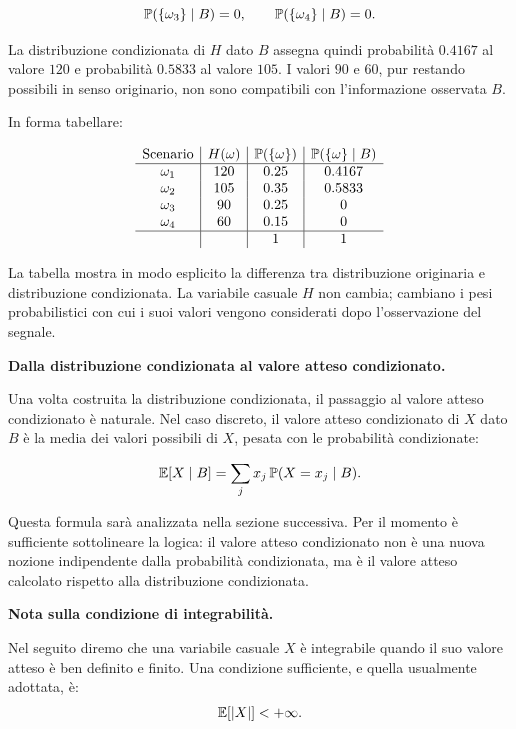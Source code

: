 \[
\mathbb{P}(\{\omega_3\}\mid B)=0,
\qquad
\mathbb{P}(\{\omega_4\}\mid B)=0.
\]

La distribuzione condizionata di $H$ dato $B$ assegna quindi probabilit\`{a} $0.4167$ al valore $120$ e probabilit\`{a} $0.5833$ al valore $105$. I valori $90$ e $60$, pur restando possibili in senso originario, non sono compatibili con l'informazione osservata $B$.

In forma tabellare:

\[
\begin{array}{c|c|c|c}
\text{Scenario} & H(\omega) & \mathbb{P}(\{\omega\}) & \mathbb{P}(\{\omega\}\mid B) \\
\hline
\omega_1 & 120 & 0.25 & 0.4167 \\
\omega_2 & 105 & 0.35 & 0.5833 \\
\omega_3 & 90  & 0.25 & 0 \\
\omega_4 & 60  & 0.15 & 0 \\
\hline
\ &   & 1 & 1 \\
\end{array}
\]

La tabella mostra in modo esplicito la differenza tra distribuzione originaria e distribuzione condizionata. La variabile casuale $H$ non cambia; cambiano i pesi probabilistici con cui i suoi valori vengono considerati dopo l'osservazione del segnale.

\medskip

\noindent
\textbf{Dalla distribuzione condizionata al valore atteso condizionato.}

Una volta costruita la distribuzione condizionata, il passaggio al valore atteso condizionato \`{e} naturale. Nel caso discreto, il valore atteso condizionato di $X$ dato $B$ \`{e} la media dei valori possibili di $X$, pesata con le probabilit\`{a} condizionate:

\[
\mathbb{E}[X\mid B]
=
\sum_j x_j\,\mathbb{P}(X=x_j\mid B).
\]

Questa formula sar\`{a} analizzata nella sezione successiva. Per il momento \`{e} sufficiente sottolineare la logica: il valore atteso condizionato non \`{e} una nuova nozione indipendente dalla probabilit\`{a} condizionata, ma \`{e} il valore atteso calcolato rispetto alla distribuzione condizionata.

\medskip

\noindent
\textbf{Nota sulla condizione di integrabilit\`{a}.}

Nel seguito diremo che una variabile casuale $X$ \`{e} integrabile quando il
suo valore atteso \`{e} ben definito e finito. Una condizione sufficiente, e
quella usualmente adottata, \`{e}:
\[
\mathbb{E}[|X|]<+\infty.
\]

